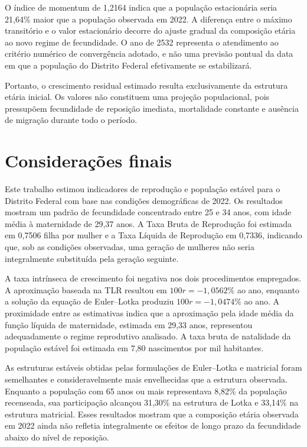 \documentclass[a4paper,12pt]{article}
\begin{document}
O índice de momentum de 1,2164 indica que a população estacionária seria 21,64\% maior que a 
população observada em 2022. A diferença entre o máximo transitório e o valor estacionário 
decorre do ajuste gradual da composição etária ao novo regime de fecundidade. O ano de 2532 
representa o atendimento ao critério numérico de convergência adotado, e não uma previsão 
pontual da data em que a população do Distrito Federal efetivamente se estabilizará.

Portanto, o crescimento residual estimado resulta exclusivamente da estrutura etária inicial. Os valores não constituem uma projeção populacional, pois pressupõem fecundidade de reposição imediata, mortalidade constante e ausência de migração durante todo o período.


\section{Considerações finais}

Este trabalho estimou indicadores de reprodução e população estável para o Distrito Federal com 
base nas condições demográficas de 2022. Os resultados mostram um padrão de fecundidade 
concentrado entre 25 e 34 anos, com idade média à maternidade de 29,37 anos. A Taxa Bruta de 
Reprodução foi estimada em 0,7506 filha por mulher e a Taxa Líquida de Reprodução em 0,7336, 
indicando que, sob as condições observadas, uma geração de mulheres não seria integralmente 
substituída pela geração seguinte.

A taxa intrínseca de crescimento foi negativa nos dois procedimentos empregados. A aproximação 
baseada na TLR resultou em $100r=-1{,}0562\%$ ao ano, enquanto a solução da equação de Euler--Lotka 
produziu $100r=-1{,}0474\%$ ao ano. A proximidade entre as estimativas indica que a aproximação pela 
idade média da função líquida de maternidade, estimada em 29,33 anos, representou adequadamente o regime reprodutivo 
analisado. A taxa bruta de natalidade da população estável foi estimada em 7,80 nascimentos por 
mil habitantes.

As estruturas estáveis obtidas pelas formulações de Euler--Lotka e matricial foram semelhantes e consideravelmente mais envelhecidas que a estrutura observada. Enquanto a população com 65 anos ou mais representava 8,82\% da população recenseada, sua participação alcançou 31,30\% na estrutura de Lotka e 33,14\% na estrutura matricial. Esses resultados mostram que a composição etária observada em 2022 ainda não refletia integralmente os efeitos de longo prazo da fecundidade abaixo do nível de reposição.
\end{document}
